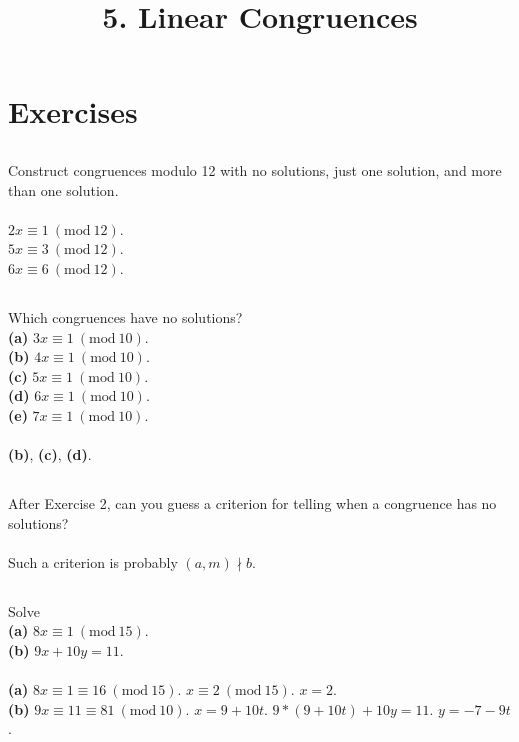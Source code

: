 \documentclass{article}
\begin{document}
\newcommand{\Z}{\mathbb{Z}}
\newcommand{\Mod}[1]{\ (\mathrm{mod}\ #1)}

\title{5. Linear Congruences}
\section{Exercises}

\subsection{}
Construct congruences modulo 12 with no solutions, just one solution,
and more than one solution.\\~\\
$2x \equiv 1 \Mod{12}$.\\
$5x \equiv 3 \Mod{12}$.\\
$6x \equiv 6 \Mod{12}$.

\subsection{}
Which congruences have no solutions?\\
\textbf{(a)} $3x \equiv 1 \Mod{10}$.\\
\textbf{(b)} $4x \equiv 1 \Mod{10}$.\\
\textbf{(c)} $5x \equiv 1 \Mod{10}$.\\
\textbf{(d)} $6x \equiv 1 \Mod{10}$.\\
\textbf{(e)} $7x \equiv 1 \Mod{10}$.\\~\\
\textbf{(b)}, \textbf{(c)}, \textbf{(d)}.

\subsection{}
After Exercise 2, can you guess a criterion for telling when a congruence
has no solutions?\\~\\
Such a criterion is probably $(a, m) \nmid b$.

\subsection{}
Solve\\
\textbf{(a)} $8x \equiv 1 \Mod{15}$.\\
\textbf{(b)} $9x + 10y = 11$.\\~\\
\textbf{(a)}
$8x \equiv 1 \equiv 16 \Mod{15}$. $x \equiv 2 \Mod{15}$. $x = 2$.\\
\textbf{(b)}
$9x \equiv 11 \equiv 81 \Mod{10}$. $x = 9 + 10t$.
$9 * (9 + 10t) + 10y = 11$.  $y = -7 - 9t$.
\end{document}
